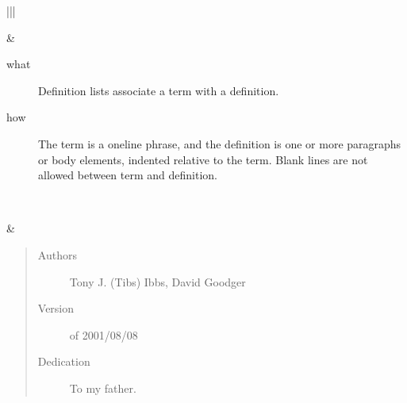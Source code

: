 \documentclass[letterpaper,10pt,english]{sphinxmanual}
\begin{document}
\begin{savenotes}
\begin{tabular}[t]{|*{2}{|}}
\begin{sphinxVerbatimintable}[commandchars=\\\{\}]
         
        
       
       
     
\end{sphinxVerbatimintable}
&\begin{description}
\item[{what}] \leavevmode
Definition lists associate a term with
a definition.

\item[{how}] \leavevmode
The term is a one\sphinxhyphen{}line phrase, and the
definition is one or more paragraphs or
body elements, indented relative to the
term. Blank lines are not allowed
between term and definition.

\end{description}
\\
\hline
\begin{sphinxVerbatimintable}[commandchars=\\\{\}]
       
     

   
   
\end{sphinxVerbatimintable}
&\begin{quote}\begin{description}
\item[{Authors}] \leavevmode
Tony J. (Tibs) Ibbs,
David Goodger

\item[{Version}]  of 2001/08/08

\item[{Dedication}] \leavevmode
To my father.


\end{description}
\end{quote}
\end{tabular}
\end{savenotes}
\end{document}
